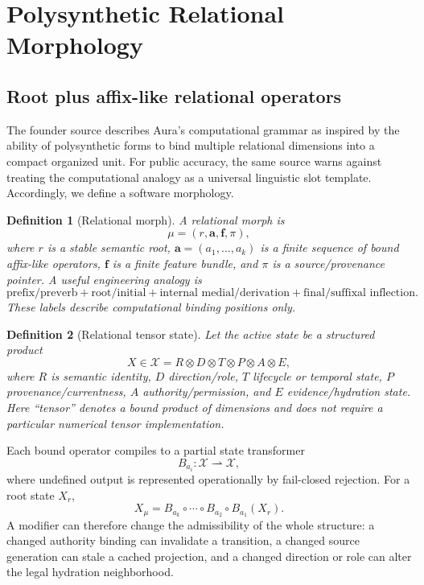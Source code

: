 \documentclass[11pt]{article}
\newtheorem{definition}{Definition}
\begin{document}
\section{Polysynthetic Relational Morphology}

\subsection{Root plus affix-like relational operators}

The founder source describes Aura's computational grammar as inspired by the ability of polysynthetic forms to bind multiple relational dimensions into a compact organized unit. For public accuracy, the same source warns against treating the computational analogy as a universal linguistic slot template. Accordingly, we define a software morphology.

\begin{definition}[Relational morph]
A relational morph is
\[
\mu=(r,\mathbf{a},\mathbf{f},\pi),
\]
where \(r\) is a stable semantic root, \(\mathbf{a}=(a_1,\ldots,a_k)\) is a finite sequence of bound affix-like operators, \(\mathbf{f}\) is a finite feature bundle, and \(\pi\) is a source/provenance pointer. A useful engineering analogy is
\[
\text{prefix/preverb}+\text{root/initial}+\text{internal medial/derivation}+\text{final/suffixal inflection}.
\]
These labels describe computational binding positions only.
\end{definition}

\begin{definition}[Relational tensor state]
Let the active state be a structured product
\[
X\in\mathcal{X}=R\otimes D\otimes T\otimes P\otimes A\otimes E,
\]
where \(R\) is semantic identity, \(D\) direction/role, \(T\) lifecycle or temporal state, \(P\) provenance/currentness, \(A\) authority/permission, and \(E\) evidence/hydration state. Here ``tensor'' denotes a bound product of dimensions and does not require a particular numerical tensor implementation.
\end{definition}

Each bound operator compiles to a partial state transformer
\[
B_{a_i}:\mathcal{X}\rightharpoonup\mathcal{X},
\]
where undefined output is represented operationally by fail-closed rejection. For a root state \(X_r\),
\[
X_\mu=B_{a_k}\circ\cdots\circ B_{a_2}\circ B_{a_1}(X_r).
\]
A modifier can therefore change the admissibility of the whole structure: a changed authority binding can invalidate a transition, a changed source generation can stale a cached projection, and a changed direction or role can alter the legal hydration neighborhood.
\end{document}
